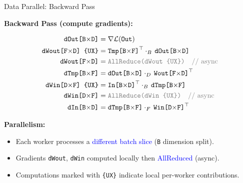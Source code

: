 \documentclass{beamer}
\begin{document}
\begin{frame}[fragile]{Data Parallel: Backward Pass}

\textbf{Backward Pass (compute gradients):}
\vspace{1mm}

\begin{align*}
\texttt{dOut[B$\times$D]} &= \nabla \mathcal{L}(\texttt{Out}) \\
\texttt{dWout[F$\times$D] \{UX\}} &= \texttt{Tmp[B$\times$F]}^\top 
\cdot_B\, \texttt{dOut[B$\times$D]} \\
\texttt{dWout[F$\times$D]} &= \textcolor{gray}{\texttt{AllReduce(dWout \{UX\})}} 
\quad \textcolor{gray}{\text{// async}} \\
\texttt{dTmp[B$\times$F]} &= \texttt{dOut[B$\times$D]} 
\cdot_D\, \texttt{Wout[F$\times$D]}^\top \\
\texttt{dWin[D$\times$F] \{UX\}} &= \texttt{In[B$\times$D]}^\top 
\cdot_B\, \texttt{dTmp[B$\times$F]} \\
\texttt{dWin[D$\times$F]} &= \textcolor{gray}{\texttt{AllReduce(dWin \{UX\})}} 
\quad \textcolor{gray}{\text{// async}} \\
\texttt{dIn[B$\times$D]} &= \texttt{dTmp[B$\times$F]} 
\cdot_F\, \texttt{Win[D$\times$F]}^\top
\end{align*}

\vspace{1mm}
\textbf{Parallelism:}
\begin{itemize}
  \item Each worker processes a \textcolor{blue}{different batch slice} (\texttt{B} dimension split).
  \item Gradients \texttt{dWout}, \texttt{dWin} computed locally then \textcolor{blue}{AllReduced} (async).
  \item Computations marked with \texttt{\{UX\}} indicate local per-worker contributions.
\end{itemize}

\end{frame}



\end{document}
